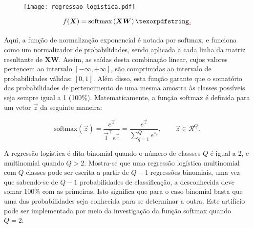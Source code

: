     \DIFaddbegin \begin{figure}
      \begin{center}
        \texttt{[image: regressao\_logistica.pdf]}
      \end{center}
      \caption{}
      \label{f:regressao_logistica}
    \end{figure}

    \DIFaddend \begin{equation} \label{e:reg_logistica}
      f(\boldsymbol{X}) = \text{softmax}\left(\boldsymbol{X} \boldsymbol{W}\right)
    \DIFdelbegin \DIFdel{.
    }\DIFdelend \end{equation}

    \noindent Aqui, a função de normalização exponencial é notada por $\text{softmax}$, e funciona como um normalizador de probabilidades, sendo aplicada a cada linha da matriz resultante de $\boldsymbol{X}\boldsymbol{W}$. Assim, as saídas desta combinação linear, cujos valores pertencem ao intervalo $[-\infty,+\infty]$, são comprimidas ao intervalo de probabilidades válidas: $[0,1]$. Além disso, esta função garante que o somatório das probabilidades de pertencimento de uma mesma amostra às classes possíveis seja sempre igual a 1 (100\%). Matematicamente, a função $\text{softmax}$ é definida para um vetor $\vec{z}$ da seguinte maneira:

    \begin{equation} \label{e:softmax}
      \text{softmax}(\vec{z}) =
      \frac{e^{\vec{z}}}{\vec{1}^\top e^{\vec{z}}} =
      \frac{e^{\vec{z}}}{\sum_{q=1}^Q e^{z_q}}
      , \qquad \vec{z} \in \mathcal{R}^Q
      .
    \end{equation}

    A regressão logística é dita binomial quando o número de classses $Q$ é igual a 2, e multinomial quando $Q>2$. Mostra-se que uma regressão logística multinomial com $Q$ classes pode ser escrita a partir de $Q-1$ regressões binomiais, uma vez que sabendo-se de $Q-1$ probabilidades de classificação, a desconhecida deve somar 100\% com as primeiras. Isto significa que para o caso binomial basta que uma das probabilidades seja conhecida para se determinar a outra. Este artifício pode ser implementada por meio da investigação da função softmax quando $Q=2$:

